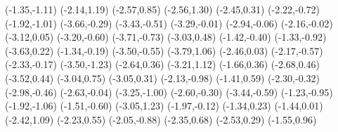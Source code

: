 \psdot[](-1.35,-1.11)
\psdot[](-2.14,1.19)
\psdot[](-2.57,0.85)
\psdot[](-2.56,1.30)
\psdot[](-2.45,0.31)
\psdot[](-2.22,-0.72)
\psdot[](-1.92,-1.01)
\psdot[](-3.66,-0.29)
\psdot[](-3.43,-0.51)
\psdot[](-3.29,-0.01)
\psdot[](-2.94,-0.06)
\psdot[](-2.16,-0.02)
\psdot[](-3.12,0.05)
\psdot[](-3.20,-0.60)
\psdot[](-3.71,-0.73)
\psdot[](-3.03,0.48)
\psdot[](-1.42,-0.40)
\psdot[](-1.33,-0.92)
\psdot[](-3.63,0.22)
\psdot[](-1.34,-0.19)
\psdot[](-3.50,-0.55)
\psdot[](-3.79,1.06)
\psdot[](-2.46,0.03)
\psdot[](-2.17,-0.57)
\psdot[](-2.33,-0.17)
\psdot[](-3.50,-1.23)
\psdot[](-2.64,0.36)
\psdot[](-3.21,1.12)
\psdot[](-1.66,0.36)
\psdot[](-2.68,0.46)
\psdot[](-3.52,0.44)
\psdot[](-3.04,0.75)
\psdot[](-3.05,0.31)
\psdot[](-2.13,-0.98)
\psdot[](-1.41,0.59)
\psdot[](-2.30,-0.32)
\psdot[](-2.98,-0.46)
\psdot[](-2.63,-0.04)
\psdot[](-3.25,-1.00)
\psdot[](-2.60,-0.30)
\psdot[](-3.44,-0.59)
\psdot[](-1.23,-0.95)
\psdot[](-1.92,-1.06)
\psdot[](-1.51,-0.60)
\psdot[](-3.05,1.23)
\psdot[](-1.97,-0.12)
\psdot[](-1.34,0.23)
\psdot[](-1.44,0.01)
\psdot[](-2.42,1.09)
\psdot[](-2.23,0.55)
\psdot[](-2.05,-0.88)
\psdot[](-2.35,0.68)
\psdot[](-2.53,0.29)
\psdot[](-1.55,0.96)
